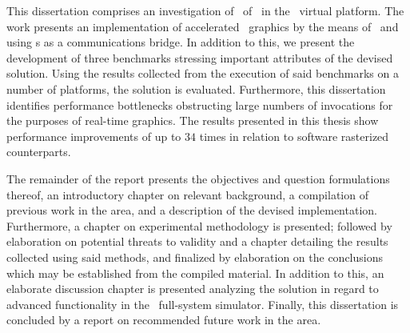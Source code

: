 This dissertation comprises an investigation of \dvttermparavirtualization\ of \dvttermopengles\ in the \dvttermsimics\ virtual platform.
The work presents an implementation of accelerated \dvttermopenglestwopointo\ graphics by the means of \dvttermparavirtualization\ and using \dvttermmagicinstruction s as a communications bridge.
In addition to this, we present the development of three benchmarks stressing important attributes of the devised solution.
Using the results collected from the execution of said benchmarks on a number of platforms, the solution is evaluated.
Furthermore, this dissertation identifies performance bottlenecks obstructing large numbers of  invocations for the purposes of real-time graphics.
The results presented in this thesis show performance improvements of up to $34$ times in relation to software rasterized counterparts.

The remainder of the report presents the objectives and question formulations thereof, an introductory chapter on relevant background, a compilation of previous work in the area, and a description of the devised  implementation.
Furthermore, a chapter on experimental methodology is presented; followed by elaboration on potential threats to validity and a chapter detailing the results collected using said methods, and finalized by elaboration on the conclusions which may be established from the compiled material.
In addition to this, an elaborate discussion chapter is presented analyzing the  solution in regard to advanced functionality in the \dvttermsimics\ full-system simulator.
Finally, this dissertation is concluded by a report on recommended future work in the area.
